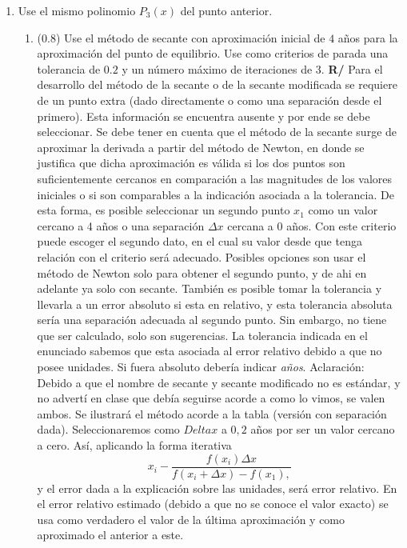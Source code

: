 \documentclass[12pt]{article}
\begin{document}
\begin{enumerate}[leftmargin=*,widest=9]
\begin{enumerate}[label=\alph*]
    \end{enumerate}
    \item Use el mismo polinomio \(P_3(x)\) del punto anterior.
    \begin{enumerate}[label=\alph*]
    \item (\(0.8\)) Use el método de secante con aproximación inicial de \(4\) años para la aproximación del punto de equilibrio. Use como criterios de parada una tolerancia de \(0.2\) y un número máximo de iteraciones de 3.
    \textbf{R/} Para el desarrollo del método de la secante o de la secante modificada se requiere de un punto extra (dado directamente o como una separación desde el primero). Esta información se encuentra ausente y por ende se debe seleccionar. Se debe tener en cuenta que el método de la secante surge de aproximar la derivada a partir del método de Newton, en donde se justifica que dicha aproximación es válida si los dos puntos son suficientemente cercanos en comparación a las magnitudes de los valores iniciales o si son comparables a la indicación asociada a la tolerancia.
    De esta forma, es posible seleccionar un segundo punto \(x_1\) como un valor cercano a 4 años o una separación \(\Delta x\) cercana a 0 años. Con este criterio puede escoger el segundo dato, en el cual su valor desde que tenga relación con el criterio será adecuado.
    Posibles opciones son usar el método de Newton solo para obtener el segundo punto, y de ahi en adelante ya solo con secante. También es posible tomar la tolerancia y llevarla a un error absoluto si esta en relativo, y esta tolerancia absoluta sería una separación adecuada al segundo punto. Sin embargo, no tiene que ser calculado, solo son sugerencias.
    La tolerancia indicada en el enunciado sabemos que esta asociada al error relativo debido a que no posee unidades. Si fuera absoluto debería indicar \textit{años}.
    Aclaración: Debido a que el nombre de secante y secante modificado no es estándar, y no advertí en clase que debía seguirse acorde a como lo vimos, se valen ambos. Se ilustrará el método acorde a la tabla (versión con separación dada).
    Seleccionaremos como \(Delta x\) a \(0,2\) años por ser un valor cercano a cero. Así, aplicando la forma iterativa \[x_i - \frac{f(x_i)\Delta x}{f(x_i + \Delta x) - f(x_1),}\] y el error dada a la explicación sobre las unidades, será error relativo. En el error relativo estimado (debido a que no se conoce el valor exacto) se usa como verdadero el valor de la última aproximación y como aproximado el anterior a este.
    \[
    \begin{array}{|c|c|c|c|}

\end{array}\]
\end{enumerate}
\end{enumerate}
\end{document}
